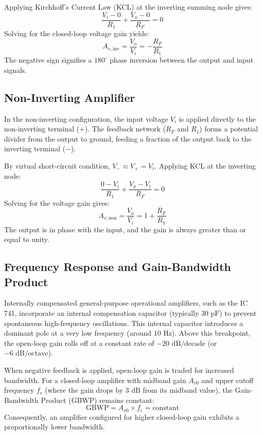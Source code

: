 \documentclass[12pt,a4paper]{article}
\begin{document}
Applying Kirchhoff's Current Law (KCL) at the inverting summing node gives:
\begin{equation}
    \frac{V_i - 0}{R_1} + \frac{V_o - 0}{R_F} = 0
\end{equation}
Solving for the closed-loop voltage gain yields:
\begin{equation}
    A_{v,\text{inv}} = \frac{V_o}{V_i} = -\frac{R_F}{R_1}
\end{equation}
The negative sign signifies a $180^\circ$ phase inversion between the output and input signals.

\subsection{Non-Inverting Amplifier}
In the non-inverting configuration, the input voltage $V_i$ is applied directly to the non-inverting terminal ($+$). The feedback network ($R_F$ and $R_1$) forms a potential divider from the output to ground, feeding a fraction of the output back to the inverting terminal ($-$).

By virtual short-circuit condition, $V_- \approx V_+ = V_i$. Applying KCL at the inverting node:
\begin{equation}
    \frac{0 - V_i}{R_1} + \frac{V_o - V_i}{R_F} = 0
\end{equation}
Solving for the voltage gain gives:
\begin{equation}
    A_{v,\text{non}} = \frac{V_o}{V_i} = 1 + \frac{R_F}{R_1}
\end{equation}
The output is in phase with the input, and the gain is always greater than or equal to unity.

\subsection{Frequency Response and Gain-Bandwidth Product}
Internally compensated general-purpose operational amplifiers, such as the IC 741, incorporate an internal compensation capacitor (typically $30\text{ pF}$) to prevent spontaneous high-frequency oscillations. This internal capacitor introduces a dominant pole at a very low frequency (around $10\text{ Hz}$). Above this breakpoint, the open-loop gain rolls off at a constant rate of $-20\text{ dB/decade}$ (or $-6\text{ dB/octave}$).

When negative feedback is applied, open-loop gain is traded for increased bandwidth. For a closed-loop amplifier with midband gain $A_{v0}$ and upper cutoff frequency $f_c$ (where the gain drops by $3\text{ dB}$ from its midband value), the Gain-Bandwidth Product (GBWP) remains constant:
\begin{equation}
    \text{GBWP} = A_{v0} \times f_c = \text{constant}
\end{equation}
Consequently, an amplifier configured for higher closed-loop gain exhibits a proportionally lower bandwidth.
\end{document}
